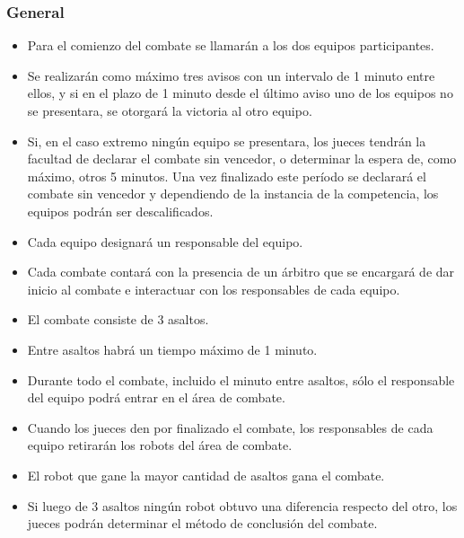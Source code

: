 \documentclass[a4paper,11pt]{article}
\begin{document}
\subsubsection*{General}
\begin{itemize}
\item Para el comienzo del combate se llamarán a los dos equipos participantes.
\item Se realizarán como máximo tres avisos con un intervalo de 1 minuto entre ellos, y si en el plazo de 1 minuto desde el último aviso uno de los equipos no se presentara, se otorgará la victoria al otro equipo.
\item Si, en el caso extremo ningún equipo se presentara, los jueces tendrán la facultad de declarar el combate sin vencedor, o determinar la espera de, como máximo, otros 5 minutos. Una vez finalizado este período se declarará el combate sin vencedor y dependiendo de la instancia de la competencia, los equipos podrán ser descalificados.
\item Cada equipo designará un responsable del equipo.
\item Cada combate contará con la presencia de un árbitro que se encargará de dar inicio al combate e interactuar con los responsables de cada equipo.
\item El combate consiste de 3 asaltos.
\item Entre asaltos habrá un tiempo máximo de 1 minuto.
\item Durante todo el combate, incluido el minuto entre asaltos, sólo el responsable del equipo podrá entrar en el área de combate.
\item Cuando los jueces den por finalizado el combate, los responsables de cada equipo retirarán los robots del área de combate.
\item El robot que gane la mayor cantidad de asaltos gana el combate.
\item Si luego de 3 asaltos ningún robot obtuvo una diferencia respecto del otro, los jueces podrán determinar el método de conclusión del combate.
\end{itemize}
\end{document}
